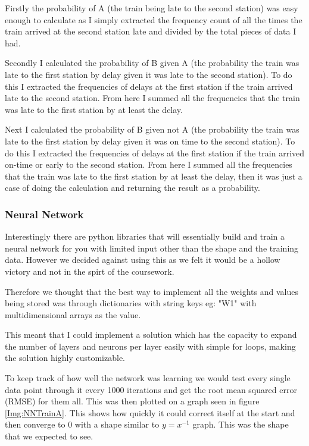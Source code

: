 \documentclass[11pt]{article}
\begin{document}
	Firstly the probability of A (the train being late to the second station)  was easy enough to calculate as I simply extracted the frequency count of all the times the train arrived at the second station late and divided by the total pieces of data I had.

	Secondly I calculated the probability of B given A (the probability the train was late to the first station by delay given it was late to the second station). To do this I extracted the frequencies of delays at the first station if the train arrived late to the second station. From here I summed all the frequencies that the train was late to the first station by at least the delay.

	Next I calculated the probability of B given not A (the probability the train was late to the first station by delay given it was on time to the second station). To do this I extracted the frequencies of delays at the first station if the train arrived on-time or early to the second station. From here I summed all the frequencies that the train was late to the first station by at least the delay, then it was just a case of doing the calculation and returning the result as a probability.

	\subsubsection{Neural Network}
	Interestingly there are python libraries that will essentially build and train a neural network for you with limited input other than the shape and the training data. However we decided against using this as we felt it would be a hollow victory and not in the spirt of the coursework.
	
	 Therefore we thought that the best way to implement all the weights and values being stored was through dictionaries with string keys eg: "W1" with multidimensional arrays as the value.

	 This meant that I could implement a solution which has the capacity to expand the number of layers and neurons per layer easily with simple for loops, making the solution highly customizable.

	 To keep track of how well the network was learning we would test every single data point through it every 1000 iterations and get the root mean squared error (RMSE) for them all. This was then plotted on a graph seen in figure \ref{Img:NNTrainA}. This shows how quickly it could correct itself at the start and then converge to 0 with a shape similar to $y=x^{-1}$ graph. This was the shape that we expected to see.
\end{document}
